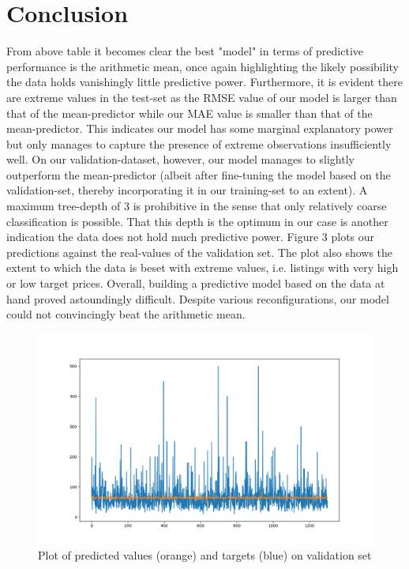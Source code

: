 \documentclass[11pt, oneside]{article}   	%
\begin{document}
\section{Conclusion}
From above table it becomes clear the best "model" in terms of predictive performance is the arithmetic mean, once again highlighting the likely possibility the data holds vanishingly little predictive power.
\newline
\indent Furthermore, it is evident there are extreme values in the test-set as the RMSE value of our model is larger than that of the mean-predictor while our MAE value is smaller than that of the mean-predictor. This indicates our model has some marginal explanatory power but only manages to capture the presence of extreme observations insufficiently well. On our validation-dataset, however, our model manages to slightly outperform the mean-predictor (albeit after fine-tuning the model based on the validation-set, thereby incorporating it in our training-set to an extent).\newline
\indent A maximum tree-depth of 3 is prohibitive in the sense that only relatively coarse classification is possible. That this depth is the optimum in our case is another indication the data does not hold much predictive power. Figure 3 plots our predictions against the real-values of the validation set. The plot also shows the extent to which the data is beset with extreme values, i.e. listings with very high or low target prices.\newline
Overall, building a predictive model based on the data at hand proved astoundingly difficult. Despite various reconfigurations, our model could not convincingly beat the arithmetic mean.




\begin{figure}[h]

\centering
	\includegraphics[width=1\linewidth]{PredsVSValids}
\caption{Plot of predicted values (orange) and targets (blue) on validation set}
\label{figure label}
\end{figure}
\end{document}
